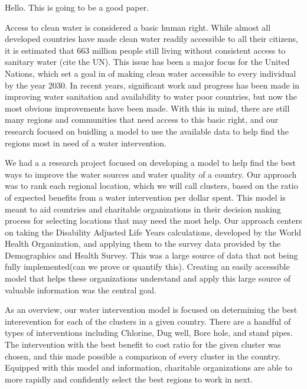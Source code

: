 Hello. This is going to be a good paper.

Access to clean water is considered a basic human right. While almost all developed countries have made clean water readily accessible to all their citizens, it is estimated that 663 million people still living without consistent access to sanitary water (cite the UN).
This issue has been a major focus for the United Nations, which set a goal in of making clean water accessible to every individual by the year 2030.
In recent years, significant work and progress has been made in improving water sanitation and availability to water poor countries, but now the most obvious improvements have been made.
With this in mind, there are still many regions and communities that need access to this basic right, and our research focused on buidling a model to use the available data to help find the regions most in need of a water intervention.  

We had a a research project focused on developing a model to help find the best ways to improve the water sources and water quality of a country.
Our approach was to rank each regional location, which we will call clusters, based on the ratio of expected benefits from a water intervention per dollar spent.
This model is meant to aid countries and charitable organizations in their decision making process for selecting locations that may need the most help.
Our approach centers on taking the Disability Adjusted Life Years calculations, developed by the World Health Organization, and applying them to the survey data provided by the Demographics and Health Survey.
This was a large source of data that not being fully implemented(can we prove or quantify this).
Creating an easily accessible model that helps these organizations understand and apply this large source of valuable information was the central goal.  
	
As an overview, our water intervention model is focused on determining the best interevention for each of the clusters in a given country.
There are a handful of types of interventions including Chlorine, Dug well, Bore hole, and stand pipes.
The intervention with the best benefit to cost ratio for the given cluster was chosen, and this made possible a comparison of every cluster in the country.
Equipped with this model and information, charitable organizations are able to more rapidly and confidently select the best regions to work in next.